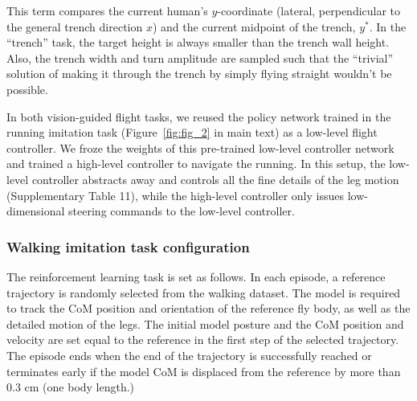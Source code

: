 \documentclass[sn-mathphys-num]{sn-jnl}%
\theoremstyle{thmstyleone}	%
\theoremstyle{thmstyletwo}	%
\theoremstyle{thmstylethree}	%
\begin{document}
\begin{appendices}
This term compares the current human's $ y $-coordinate (lateral, perpendicular to the general trench direction $ x $) and the current midpoint of the trench, $ y^{*} $.
In the “trench” task, the target height is always smaller than the trench wall height. 
Also, the trench width and turn amplitude are sampled such that the “trivial” solution of making it through the trench by simply flying straight wouldn’t be possible.


In both vision-guided flight tasks, we reused the policy network trained in the running imitation task (Figure~\ref{fig:fig_2} in main text) as a low-level flight controller. 
We froze the weights of this pre-trained low-level controller network and trained a high-level controller to navigate the running. 
In this setup, the low-level controller abstracts away and controls all the fine details of the leg motion (Supplementary Table 11), while the high-level controller only issues low-dimensional steering commands to the low-level controller.



\subsubsection{Walking imitation task configuration}

The reinforcement learning task is set as follows. 
In each episode, a reference trajectory is randomly selected from the walking dataset. 
The model is required to track the CoM position and orientation of the reference fly body, as well as the detailed motion of the legs. 
The initial model posture and the CoM position and velocity are set equal to the reference in the first step of the selected trajectory. 
The episode ends when the end of the trajectory is successfully reached or terminates early if the model CoM is displaced from the reference by more than 0.3 cm (one body length.)



\end{appendices}
\end{document}
